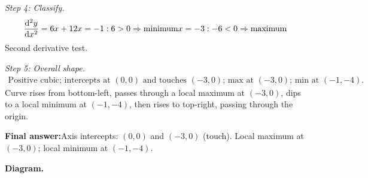 \documentclass[11pt]{article}
\begin{document}
\textit{Step 4: Classify.}
\[\begin{gathered}
\frac{\mathrm{d}^2y}{\mathrm{d}x^2} = 6x+12 \newline x=-1: 6>0 \Rightarrow \text{minimum} \newline x=-3: -6<0 \Rightarrow \text{maximum}
\end{gathered}\]
Second derivative test.

\textit{Step 5: Overall shape.}
\[\begin{gathered}
\text{Positive cubic; intercepts at }(0,0)\text{ and touches }(-3,0)\text{; max at }(-3,0)\text{; min at }(-1,-4).
\end{gathered}\]
Curve rises from bottom-left, passes through a local maximum at \((-3,0)\), dips to a local minimum at \((-1,-4)\), then rises to top-right, passing through the origin.

\begin{answerbox}
\textbf{Final answer:}\quad Axis intercepts: \(\displaystyle  (0,0) \) and \(\displaystyle  (-3, 0) \) (touch). Local maximum at \(\displaystyle  (-3, 0) \); local minimum at \(\displaystyle  (-1, -4) \).
\end{answerbox}
\textbf{Diagram.}
\end{document}
